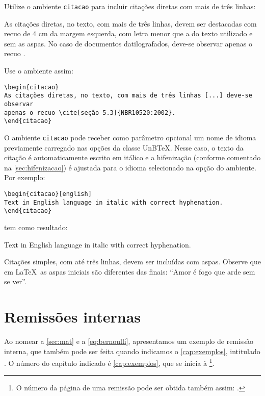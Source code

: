 Utilize o ambiente \texttt{citacao} para incluir citações diretas com mais de três linhas:
\begin{citacao}
As citações diretas, no texto, com mais de três linhas, devem ser destacadas com recuo de 4 cm da margem esquerda, com letra menor que a do texto utilizado e sem as aspas. No caso de documentos datilografados, deve-se observar apenas o recuo \cite[seção 5.3]{NBR10520:2002}.
\end{citacao}

Use o ambiente assim:
\begin{verbatim}
\begin{citacao}
As citações diretas, no texto, com mais de três linhas [...] deve-se observar
apenas o recuo \cite[seção 5.3]{NBR10520:2002}.
\end{citacao}
\end{verbatim}

O ambiente \texttt{citacao} pode receber como parâmetro opcional um nome de idioma previamente carregado nas opções da classe UnB\TeX. Nesse caso, o texto da citação é automaticamente escrito em itálico e a hifenização (conforme comentado na \cref{sec:hifenizacao}) é ajustada para o idioma selecionado na opção do ambiente. Por exemplo:
\begin{verbatim}
\begin{citacao}[english]
Text in English language in italic with correct hyphenation.
\end{citacao}
\end{verbatim}
tem como resultado:
\begin{citacao}[english]
Text in English language in italic with correct hyphenation.
\end{citacao}

Citações simples, com até três linhas, devem ser incluídas com aspas. Observe que em \LaTeX\ as aspas iniciais são diferentes das finais: ``Amor é fogo que arde sem se ver''.

\section{Remissões internas}

Ao nomear a \cref{sec:mat} e a \cref{eq:bernoulli}, apresentamos um exemplo de remissão interna, que também pode ser feita quando indicamos o \cref{cap:exemplos}, intitulado \emph{}. O número do capítulo indicado é \ref{cap:exemplos}, que se inicia à \footnote{O número da página de uma remissão pode ser obtida também assim: \pageref{cap:exemplos}.}.

